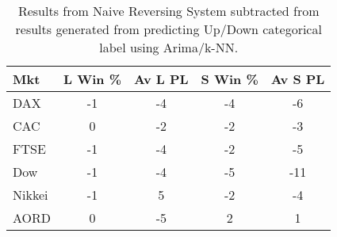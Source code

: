 \begin{table}[ht]
\centering
\caption[Naive Reversing System subtracted from Arima/k-NN predictions]{Results from Naive Reversing System subtracted from results generated from predicting Up/Down categorical label using Arima/k-NN.} 
\label{tab:chp_ts:pUD_CAT_arima_knn_sys_diff}
\begin{tabular}{lcccc}
  \toprule Mkt & L Win \% & Av L PL & S Win \% & Av S PL \\ 
  \midrule DAX & -1 & -4 & -4 & -6 \\ 
  CAC & 0 & -2 & -2 & -3 \\ 
  FTSE & -1 & -4 & -2 & -5 \\ 
  Dow & -1 & -4 & -5 & -11 \\ 
  Nikkei & -1 & 5 & -2 & -4 \\ 
  AORD & 0 & -5 & 2 & 1 \\ 
   \bottomrule \end{tabular}
\end{table}
